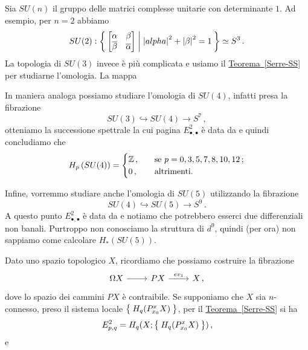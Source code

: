 \begin{ex}
	Sia $SU(n)$ il gruppo delle matrici complesse unitarie con determinante $1$.
	Ad esempio, per $n=2$ abbiamo
	\begin{equation*}
		SU(2) : \Set{ \begin{bmatrix} \alpha & \beta \\ \overline{\beta} & \overline{\alpha} \end{bmatrix}	
		| {|alpha|}^{2}	+ {|\beta|}^{2} = 1 }
		\simeq S^{3}\,.
	\end{equation*}
	La topologia di $SU(3)$ invece è più complicata
	e usiamo il \hyperref[Serre-SS]{Teorema~\ref{Serre-SS}}
	per studiarne l'omologia. La mappa 
	
	In maniera analoga possiamo studiare l'omologia
	di $SU(4)$, infatti presa la fibrazione
	\begin{equation*}
		SU(3) \hookrightarrow SU(4) \longrightarrow S^{7}\,,
	\end{equation*}
	otteniamo la successione spettrale la cui pagina $E^{2}_{\bullet,\bullet}$ 
	è data da
	e quindi concludiamo che
	\begin{equation*}
		H_{p}\left( SU(4) \right) =
		\begin{cases}
			{\mathbb Z}\,, \quad &\text{se } p = 0,3,5,7,8,10,12\,;\\
			0\,, \quad &\text{altrimenti.}
		\end{cases}
	\end{equation*}
	
	Infine, vorremmo studiare anche l'omologia di $SU(5)$ 
	utilizzando la fibrazione
	\begin{equation*}
		SU(4) \hookrightarrow SU(5) \longrightarrow S^{9}\,.
	\end{equation*}
	A questo punto $E^{2}_{\bullet,\bullet}$ 
	è data da
	e notiamo che potrebbero esserci due differenziali non banali.
	Purtroppo non conosciamo la struttura di $d^{9}$,
	quindi (per ora) non sappiamo come calcolare $H_{*}\left( SU(5) \right)$.
\end{ex}

Dato uno spazio topologico $X$, ricordiamo che possiamo costruire la fibrazione
\begin{equation*}
	\begin{tikzcd}
		\Omega X \ar[r] & PX \ar[r, "ev_{1}"] & X\,,
	\end{tikzcd}
\end{equation*}
dove lo spazio dei cammini $PX$ è contraibile. 
Se supponiamo che $X$ sia $n$-connesso,
preso il sistema locale $\Set{H_{q}(P_{x_{0}}^{x}X)}$,
per il  \hyperref[Serre-SS]{Teorema~\ref{Serre-SS}} si ha
\begin{equation*}
	E^{2}_{p,q} = H_{q}(X;\Set{H_{q}(P_{x_{0}}^{x}X)})\,,
\end{equation*}
e 






